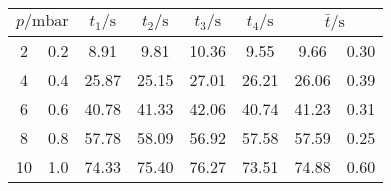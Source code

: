 \label{tab:tabDL1}
	\begin{tabular}{S[table-format=2.0] @{${}\pm{}$} S[table-format=1.1]S[table-format=2.2]S[table-format=2.2]S[table-format=2.2]S[table-format=2.2]S[table-format=2.2] @{${}\pm{}$} S[table-format=1.2]}
		\toprule
		 & {$t_1/\si{\second}$} & {$t_2/\si{\second}$} & {$t_3/\si{\second}$} & {$t_4/\si{\second}$} &  \\
		 & 0.2 & 8.91 & 9.81 & 10.36 & 9.55 & 9.66 & 0.30 \\
		 4 & 0.4 & 25.87 & 25.15 & 27.01 & 26.21 & 26.06 & 0.39 \\
		 6 & 0.6 & 40.78 & 41.33 & 42.06 & 40.74 & 41.23 & 0.31 \\
		 8 & 0.8 & 57.78 & 58.09 & 56.92 & 57.58 & 57.59 & 0.25 \\
		10 & 1.0 & 74.33 & 75.40 & 76.27 & 73.51 & 74.88 & 0.60 \\
		\bottomrule
	\end{tabular}
